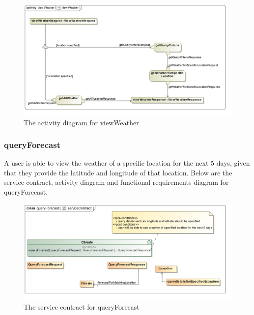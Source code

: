 \begin{figure}[H]
	\centering
	\includegraphics[scale=0.2]{../images/funcReq/viewWeatherActivityDiagram.jpg}
	\caption{The activity diagram for viewWeather \label{overflow}}
\end{figure}

\subsubsection{queryForecast}

A user is able to view the weather of a specific location for the next 5 days, given that they provide the latitude and longitude of that location.  Below are the service contract, activity diagram and functional requirements diagram for queryForecast.

\begin{figure}[H]
	\centering
	\includegraphics[scale=0.21]{../images/funcReq/queryForecastServiceContract.jpg}
	\caption{The service contract for queryForecast \label{overflow}}
\end{figure}

